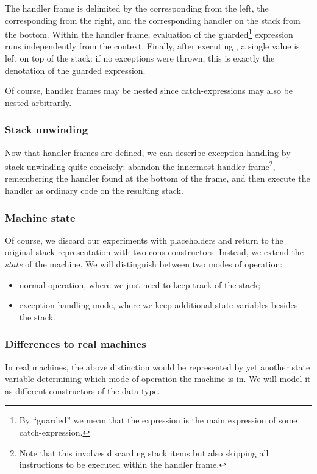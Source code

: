 The handler frame is delimited by the corresponding  from the left,
the corresponding  from the right, and the corresponding handler
on the stack from the bottom. Within the handler frame, evaluation of the
guarded\footnote{%
By ``guarded'' we mean that the expression is the main expression of
some catch-expression.
} expression runs independently from the context. Finally, after executing
, a single value is left on top of the stack: if no exceptions
were thrown, this is exactly the denotation of the guarded expression.

Of course, handler frames may be nested since catch-expressions may also
be nested arbitrarily.

\subsubsection{Stack unwinding}
Now that handler frames are defined, we can describe exception handling
by stack unwinding quite concisely: abandon the innermost handler frame\footnote{%
Note that this involves discarding stack items but also skipping all instructions
to be executed within the handler frame.},
remembering the handler found at the bottom of the frame, and then
execute the handler as ordinary code on the resulting stack.

\subsubsection{Machine state}

Of course, we discard our experiments with placeholders and return to the original
stack representation with two cons-constructors.
Instead, we extend the \emph{state} of the machine. We will distinguish between
two modes of operation:
\begin{itemize}
	\item normal operation, where we just need to keep track of the stack;
	\item exception handling mode, where we keep additional state variables besides the stack.
\end{itemize}

\subsubsection{Differences to real machines}

In real machines, the above distinction would be represented by yet another
state variable determining which mode of operation the machine is in.
We will model it as different constructors of the  data type.

